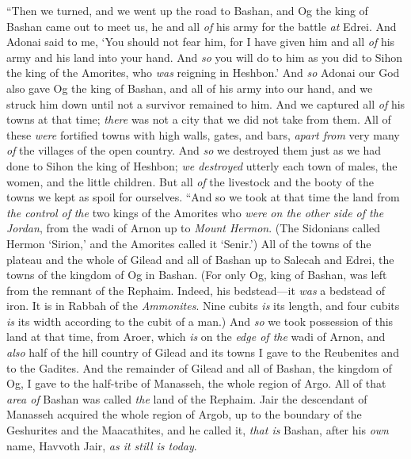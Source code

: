 \begin{biblechapter} %
\verse “Then we turned, and we went up the road to Bashan, and Og the king of Bashan came out to meet us, he and all \textit{of} his army for the battle \textit{at} Edrei.
\verse And Adonai said to me, ‘You should not fear him, for I have given him and all \textit{of} his army and his land into your hand. And \textit{so} you will do to him as you did to Sihon the king of the Amorites, who \textit{was} reigning in Heshbon.’
\verse And \textit{so} Adonai our God also gave Og the king of Bashan, and all of his army into our hand, and we struck him down until not a survivor remained to him.
\verse And we captured all \textit{of} his towns at that time; \textit{there} was not a city that we did not take from them.
\verse All of these \textit{were} fortified towns with high walls, gates, and bars, \textit{apart from} very many \textit{of} the villages of the open country.
\verse And \textit{so} we destroyed them just as we had done to Sihon the king of Heshbon; \textit{we destroyed} utterly each town of males, the women, and the little children.
\verse But all \textit{of} the livestock and the booty of the towns we kept as spoil for ourselves.
\verse “And so we took at that time the land from \textit{the control of} \textit{the} two kings of the Amorites who \textit{were} \textit{on the other side of the Jordan}, from the wadi of Arnon up to \textit{Mount Hermon}.
\verse (The Sidonians called Hermon ‘Sirion,’ and the Amorites called it ‘Senir.’)
\verse All of the towns of the plateau and the whole of Gilead and all of Bashan up to Salecah and Edrei, the towns of the kingdom of Og in Bashan.
\verse (For only Og, king of Bashan, was left from the remnant of the Rephaim. Indeed, his bedstead—it \textit{was} a bedstead of iron. It is in Rabbah of the \textit{Ammonites}. Nine cubits \textit{is} its length, and four cubits \textit{is} its width according to the cubit of a man.)
\verse And \textit{so} we took possession of this land at that time, from Aroer, which \textit{is} on the \textit{edge of the} wadi of Arnon, and \textit{also} half of the hill country of Gilead and its towns I gave to the Reubenites and to the Gadites.
\verse And the remainder of Gilead and all of Bashan, the kingdom of Og, I gave to the half-tribe of Manasseh, the whole region of Argo. All of that \textit{area of} Bashan was called \textit{the} land of the Rephaim.
\verse Jair the descendant of Manasseh acquired the whole region of Argob, up to the boundary of the Geshurites and the Maacathites, and he called it, \textit{that is} Bashan, after his \textit{own} name, Havvoth Jair, \textit{as it still is today}.

\end{biblechapter}
